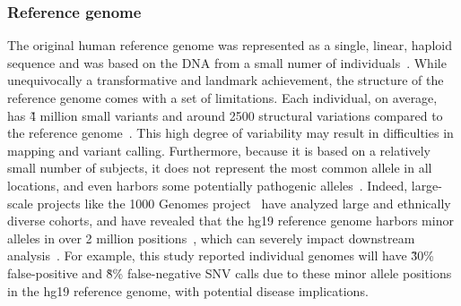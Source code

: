 \subsubsection{Reference genome}
The original human reference genome was represented as a single, linear, haploid sequence and was based on the DNA from a small numer of individuals~\cite{venter2001sequence}.
While unequivocally a transformative and landmark achievement, the structure of the reference genome comes with a set of limitations. Each individual, on average, has \~4 million small variants and around 2500 structural variations compared to the reference genome~\cite{10002015global, sudmant2015integrated}.
This high degree of variability may result in difficulties in mapping and variant calling. Furthermore, because it is based on a relatively small number of subjects, it does not represent the most common allele in all locations, and even harbors some potentially pathogenic alleles~\cite{barbitoff2018catching,koko2018challenges,ferrarini2015use}.
Indeed, large-scale projects like the 1000 Genomes project~\cite{10002010map} have analyzed large and ethnically diverse cohorts, and have revealed that the hg19 reference genome harbors minor alleles in over 2 million positions~\cite{10002015global}, which can severely impact downstream analysis~\cite{karthikeyan2017hg19k}.
For example, this study reported individual genomes will have \~30\% false-positive and \~8\% false-negative SNV calls due to these minor allele positions in the hg19 reference genome, with potential disease implications.

